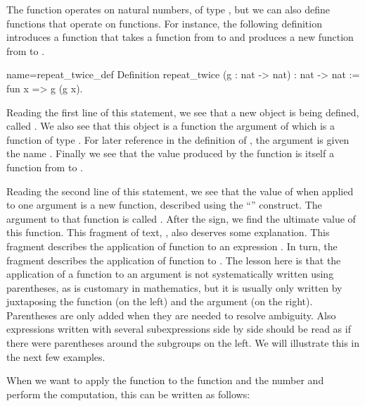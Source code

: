 The function  operates on natural numbers, of type , but
we can also define functions that operate on functions.  For instance,
the following definition introduces a function that takes a function
from  to  and produces a new function from  to
.

\begin{coq}{name=repeat_twice_def}{}
Definition repeat_twice (g : nat -> nat) : nat -> nat :=
  fun x => g (g x).
\end{coq}
Reading the first line of this statement, we see that a new object is
being defined, called .  We also see that this object
is a function the argument of which is a function of
type .  For later reference in the definition of
, the argument is given the name .  Finally
we see that the value produced by the function 
is itself a function from  to .

Reading the second line of this statement, we see that the value
of  when applied to one argument is a new
function, described using the ``'' construct.  The
argument to that function is called .  After the \C{=>} sign, we
find the ultimate value of this function.  This fragment of text, , also deserves some explanation.  This fragment describes the
application of function  to an expression .  In turn,
the fragment  describes the application of function  to
.  The lesson here is that the application of a function to an
argument is not systematically written using parentheses, as is
customary in mathematics, but it is usually only written by
juxtaposing the function (on the left) and the argument (on the
right).  Parentheses are only added when they are needed to resolve
ambiguity.  Also expressions written with several subexpressions side
by side should be read as if there were parentheses around the
subgroups on the left.  We will illustrate this in the next few
examples.

When we want to apply the function  to the function
 and the number  and perform the computation, this can be
written as follows:

